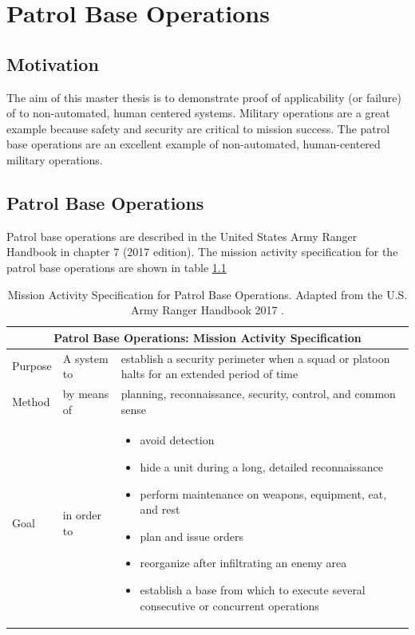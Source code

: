 \documentclass[../../main/main.tex]{subfiles}
\begin{document}
\chapter{Patrol Base Operations}\label{chp:pb}
\section{Motivation}
The aim of this master thesis is to demonstrate proof of applicability (or failure) of  to non-automated, human centered systems.  Military operations are a great example because safety and security are critical to mission success.  The patrol base operations are an excellent example of non-automated, human-centered military operations.

\section{Patrol Base Operations}
Patrol base operations are described in the United States Army Ranger Handbook \cite{rangermanual} in chapter 7 (2017 edition).  The mission activity specification for the patrol base operations are shown in table \ref{pbtab}

\parskip=8pt
\begin{table}[h!]
\begin{center}
\begin{tabular}{ | m{3.3em} | m{3.8cm}| m{9cm} | } 
\hline
\multicolumn{3}{|c|}{Patrol Base Operations: Mission Activity Specification} \\
\hline \hline
Purpose & A system to & establish a security perimeter when a squad or platoon halts for an extended period of time \\ 
\hline
Method & by means of  & planning, reconnaissance, security, control, and common sense  \\ 
\hline
Goal & in order to & 
\begin{itemize}
\item avoid detection
\item hide a unit during a long, detailed reconnaissance
\item perform maintenance on weapons, equipment, eat, and rest
\item plan and issue orders
\item reorganize after infiltrating an enemy area
\item establish a base from which to execute several consecutive or concurrent operations
\end{itemize}

 \\ 
\hline
\end{tabular}
\end{center}
\caption{Mission Activity Specification for Patrol Base Operations.  Adapted from the U.S. Army Ranger Handbook 2017 \cite{rangermanual}.}
\label{pbtab}
\end{table}
\parskip=18pt
\end{document}
